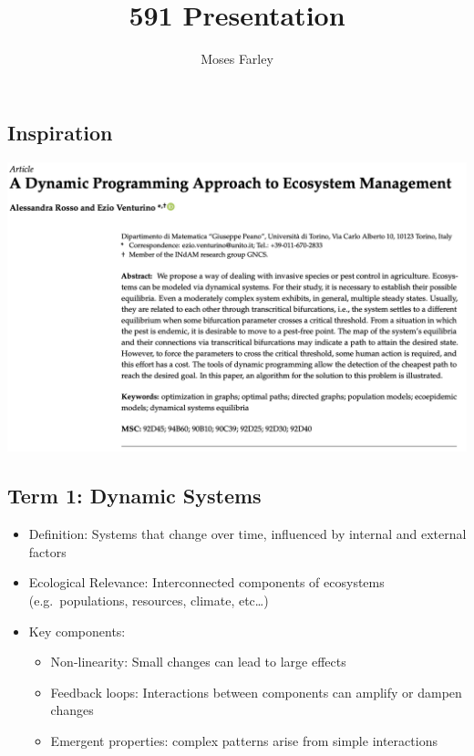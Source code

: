 \documentclass[
  letterpaper,
  DIV=11,
  numbers=noendperiod]{scrartcl}
\title{591 Presentation}
\author{Moses Farley}
\date{}
\begin{document}
\maketitle

\subsection{Inspiration}\label{inspiration}

\href{https://www.mdpi.com/1999-4893/16/3/139}{\includegraphics{images/dp_ecosystem.png}}

\subsection{Term 1: Dynamic Systems}\label{term-1-dynamic-systems}

\begin{itemize}
\item
  Definition: Systems that change over time, influenced by internal and
  external factors
\item
  Ecological Relevance: Interconnected components of ecosystems
  (e.g.~populations, resources, climate, etc\ldots)
\item
  Key components:

  \begin{itemize}
  \item
    Non-linearity: Small changes can lead to large effects
  \item
    Feedback loops: Interactions between components can amplify or
    dampen changes
  \item
    Emergent properties: complex patterns arise from simple interactions
  \end{itemize}
\end{itemize}
\end{document}
